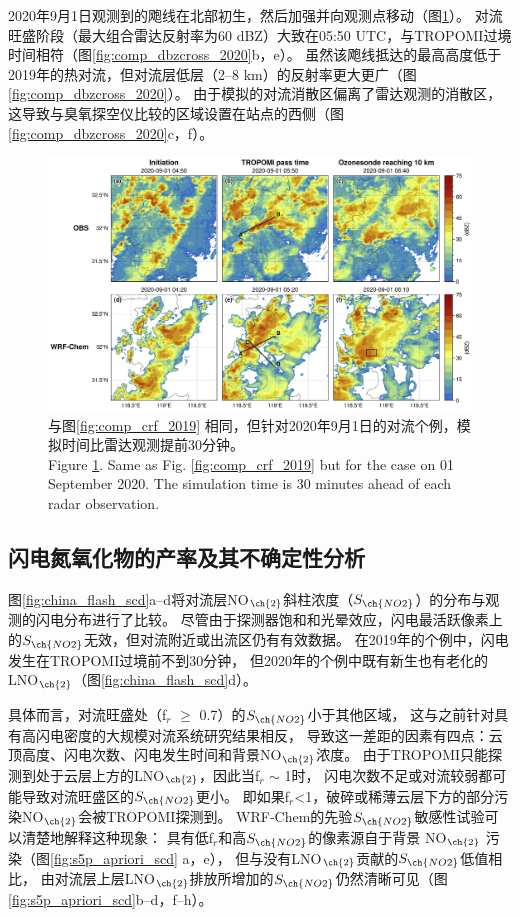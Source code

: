 2020年9月1日观测到的飑线在北部初生，然后加强并向观测点移动（图\ref{fig:comp_crf_2020}）。
对流旺盛阶段（最大组合雷达反射率为60 dBZ）大致在05:50 UTC，与TROPOMI过境时间相符（图\ref{fig:comp_dbzcross_2020}b，e）。
虽然该飑线抵达的最高高度低于2019年的热对流，但对流层低层（2--8 km）的反射率更大更广（图\ref{fig:comp_dbzcross_2020}）。
由于模拟的对流消散区偏离了雷达观测的消散区，这导致与臭氧探空仪比较的区域设置在站点的西侧（图\ref{fig:comp_dbzcross_2020}c，f）。


\begin{figure}[H]
\centering
\includegraphics[width=\textwidth]{./figures/comp_crf_2020.png}
\caption{与图\ref{fig:comp_crf_2019} 相同，但针对2020年9月1日的对流个例，模拟时间比雷达观测提前30分钟。\\
Figure \ref{fig:comp_crf_2020}. Same as Fig. \ref{fig:comp_crf_2019} but for the case on 01 September 2020.
The simulation time is 30 minutes ahead of each radar observation.}
\label{fig:comp_crf_2020}
\end{figure}

\subsection{闪电氮氧化物的产率及其不确定性分析}


图\ref{fig:china_flash_scd}a--d将对流层NO$_{\ch{2}}$斜柱浓度（$S_{\ch{NO2}}$）的分布与观测的闪电分布进行了比较。
尽管由于探测器饱和和光晕效应，闪电最活跃像素上的$S_{\ch{NO2}}$无效，但对流附近或出流区仍有有效数据。
在2019年的个例中，闪电发生在TROPOMI过境前不到30分钟，
但2020年的个例中既有新生也有老化的LNO$_{\ch{2}}$（图\ref{fig:china_flash_scd}d）。

具体而言，对流旺盛处（f$_r$ $\geq$ 0.7）的$S_{\ch{NO2}}$小于其他区域，
这与之前针对具有高闪电密度的大规模对流系统研究结果相反\citep{Beirle.2009}，
导致这一差距的因素有四点：云顶高度、闪电次数、闪电发生时间和背景NO$_{\ch{2}}$浓度。
由于TROPOMI只能探测到处于云层上方的LNO$_{\ch{2}}$，因此当f$_r$ $\sim$ 1时，
闪电次数不足或对流较弱都可能导致对流旺盛区的$S_{\ch{NO2}}$更小。
即如果f$_r$<1，破碎或稀薄云层下方的部分污染NO$_{\ch{2}}$会被TROPOMI探测到。
WRF-Chem的先验$S_{\ch{NO2}}$敏感性试验可以清楚地解释这种现象：
具有低f$_r$和高$S_{\ch{NO2}}$的像素源自于背景 NO$_{\ch{2}}$ 污染（图\ref{fig:s5p_apriori_scd} a，e），
但与没有LNO$_{\ch{2}}$贡献的$S_{\ch{NO2}}$低值相比，
由对流层上层LNO$_{\ch{2}}$排放所增加的$S_{\ch{NO2}}$仍然清晰可见（图\ref{fig:s5p_apriori_scd}b--d，f--h）。


